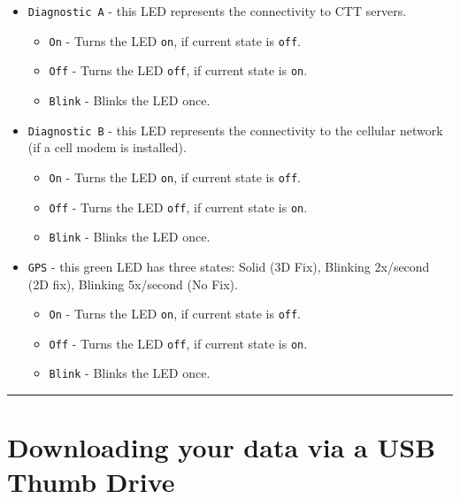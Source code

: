 \documentclass[
]{article}
\providecommand{\tightlist}{%
  \setlength{\itemsep}{0pt}\setlength{\parskip}{0pt}}
\begin{document}
\begin{itemize}
  \begin{itemize}
  \tightlist
  \item
    \texttt{Diagnostic\ A} - this LED represents the connectivity to CTT
    servers.

    \begin{itemize}
    \tightlist
    \item
      \texttt{On} - Turns the LED \texttt{on}, if current state is
      \texttt{off}.
    \item
      \texttt{Off} - Turns the LED \texttt{off}, if current state is
      \texttt{on}.
    \item
      \texttt{Blink} - Blinks the LED once.
    \end{itemize}
  \item
    \texttt{Diagnostic\ B} - this LED represents the connectivity to the
    cellular network (if a cell modem is installed).

    \begin{itemize}
    \tightlist
    \item
      \texttt{On} - Turns the LED \texttt{on}, if current state is
      \texttt{off}.
    \item
      \texttt{Off} - Turns the LED \texttt{off}, if current state is
      \texttt{on}.
    \item
      \texttt{Blink} - Blinks the LED once.
    \end{itemize}
  \item
    \texttt{GPS} - this green LED has three states: Solid (3D Fix),
    Blinking 2x/second (2D fix), Blinking 5x/second (No Fix).

    \begin{itemize}
    \tightlist
    \item
      \texttt{On} - Turns the LED \texttt{on}, if current state is
      \texttt{off}.
    \item
      \texttt{Off} - Turns the LED \texttt{off}, if current state is
      \texttt{on}.
    \item
      \texttt{Blink} - Blinks the LED once.
    \end{itemize}
  \end{itemize}
\end{itemize}

\begin{center}\rule{0.5\linewidth}{0.5pt}\end{center}

\hypertarget{downloading-your-data-via-a-usb-thumb-drive}{%
\section{Downloading your data via a USB Thumb
Drive}\label{downloading-your-data-via-a-usb-thumb-drive}}
\end{document}
